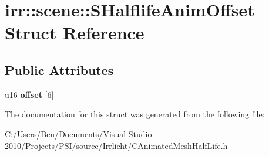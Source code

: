\hypertarget{structirr_1_1scene_1_1_s_halflife_anim_offset}{\section{irr\-:\-:scene\-:\-:S\-Halflife\-Anim\-Offset Struct Reference}
\label{structirr_1_1scene_1_1_s_halflife_anim_offset}
}
\subsection*{Public Attributes}
\begin{DoxyCompactItemize}
\item 
\hypertarget{structirr_1_1scene_1_1_s_halflife_anim_offset_aafd215e9753cb6d671306cd99e27f257}{u16 {\bfseries offset} \mbox{[}6\mbox{]}}\label{structirr_1_1scene_1_1_s_halflife_anim_offset_aafd215e9753cb6d671306cd99e27f257}

\end{DoxyCompactItemize}


The documentation for this struct was generated from the following file\-:\begin{DoxyCompactItemize}
\item 
C\-:/\-Users/\-Ben/\-Documents/\-Visual Studio 2010/\-Projects/\-P\-S\-I/source/\-Irrlicht/C\-Animated\-Mesh\-Half\-Life.\-h\end{DoxyCompactItemize}

